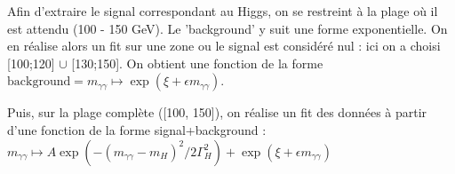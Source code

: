 \documentclass[11pt]{article} %
\begin{document}
%
%
%
%
%
%
%

Afin d'extraire le signal correspondant au Higgs, on se restreint à la plage où il est attendu (100 - 150 GeV). Le 'background' y suit une forme exponentielle. On en réalise alors un fit sur une zone ou le signal est considéré nul : ici on a choisi [100;120] $\cup$  [130;150]. On obtient une fonction de la forme $\textrm{background} = m_{\gamma\gamma} \mapsto \exp(\xi + \epsilon m_{\gamma\gamma})$.

Puis, sur la plage complète ([100, 150]), on réalise un fit des données à partir d'une fonction de la forme signal+background : $m_{\gamma\gamma} \mapsto  A \exp\left(-(m_{\gamma\gamma}-m_H)^2/2\Gamma_H^2\right) + \exp(\xi + \epsilon m_{\gamma\gamma})$
\end{document}
